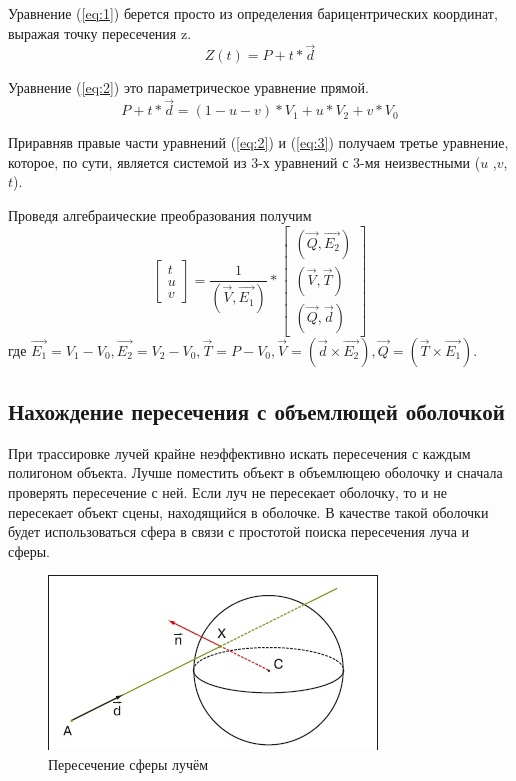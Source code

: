 \documentclass[12pt,a4paper,oneside]{report}
\begin{document}
    			Уравнение (\ref{eq:1}) берется просто из определения барицентрических координат, выражая точку пересечения z.
    			\begin{equation}
					Z(t) = P + t*\vec{d}
					\label{eq:2}
				\end{equation}
    			
    			Уравнение (\ref{eq:2}) это параметрическое уравнение прямой.
    			\begin{equation}
					P + t*\vec{d} = (1 - u - v)*V_{1} + u*V_{2} + v*V_{0}
					\label{eq:3}
				\end{equation}
    			
    			Приравняв правые части уравнений (\ref{eq:2}) и (\ref{eq:3}) получаем третье уравнение, которое, по сути, является системой из 3-х уравнений с 3-мя неизвестными ($u$ ,$v$, $t$).
    			
    			Проведя алгебраические преобразования получим
    			\[
    				\begin{bmatrix}
						t\\
						u\\
						v
					\end{bmatrix}
					= \frac{1}{(\vec{V}, \vec{E_{1}})}*
					\begin{bmatrix}
						(\vec{Q}, \vec{E_{2}})\\
						(\vec{V}, \vec{T})\\
						(\vec{Q}, \vec{d})
					\end{bmatrix}
				\]
				где $\vec{E_{1}} = V_{1} - V_{0}, \vec{E_{2}} = V_{2} - V_{0}, \vec{T} = P - V_{0}, \vec{V} = (\vec{d} \times \vec{E_{2}}), \vec{Q} = (\vec{T} \times \vec{E_{1}})$.
			\subsection{Нахождение пересечения с объемлющей оболочкой}
				\quad При трассировке лучей крайне неэффективно искать пересечения с каждым полигоном объекта. Лучше поместить объект в объемлющею оболочку и сначала проверять пересечение с ней. Если луч не пересекает оболочку, то и не пересекает объект сцены, находящийся в оболочке. В качестве такой оболочки будет использоваться сфера в связи с простотой поиска пересечения луча и сферы.
				
				\begin{figure}[htp]
					\centering
					\includegraphics{sphere}
					\caption{Пересечение сферы лучём}
					\label{fig:sphere}
				\end{figure}	
				
\end{document}
